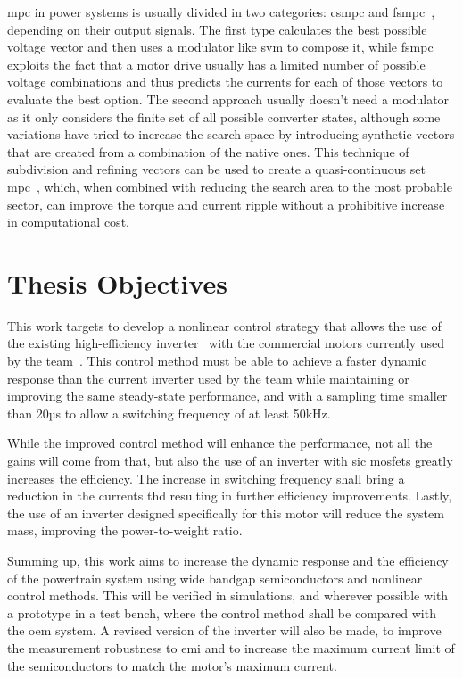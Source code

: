 \gls{mpc} in power systems is usually divided in two categories: \gls{csmpc} and \gls{fsmpc}~\cite{Wang:MPC_in_Electrical_Machines_review:2017:IEEE}, depending on their output signals. The first type calculates the best possible voltage vector and then uses a modulator like \gls{svm} to compose it, while \gls{fsmpc} exploits the fact that a motor drive usually has a limited number of possible voltage combinations and thus predicts the currents for each of those vectors to evaluate the best option. The second approach usually doesn't need a modulator as it only considers the finite set of all possible converter states, although some variations have tried to increase the search space by introducing synthetic vectors that are created from a combination of the native ones. This technique of subdivision and refining vectors can be used to create a quasi-continuous set \gls{mpc}~\cite{Ma:MPC_Syntetic_vector:2014:IEEE}, which, when combined with reducing the search area to the most probable sector, can improve the torque and current ripple without a prohibitive increase in computational cost.
\section{Thesis Objectives}\label{section:objectives}

This work targets to develop a nonlinear control strategy that allows the use of the existing high-efficiency inverter~\cite{Costa:MSc} with the commercial motors currently used by the team~\cite{amk:DD5-14-10-POW}. This control method must be able to achieve a faster dynamic response than the current inverter used by the team while maintaining or improving the same steady-state performance, and with a sampling time smaller than 20µs to allow a switching frequency of at least 50kHz.

While the improved control method will enhance the performance, not all the gains will come from that, but also the use of an inverter with \gls{sic} mosfets greatly increases the efficiency. The increase in switching frequency shall bring a reduction in the currents \gls{thd} resulting in further efficiency improvements. Lastly, the use of an inverter designed specifically for this motor will reduce the system mass, improving the power-to-weight ratio.

Summing up, this work aims to increase the dynamic response and the efficiency of the powertrain system using wide bandgap semiconductors and nonlinear control methods. This will be verified in simulations, and wherever possible with a prototype in a test bench, where the control method shall be compared with the \gls{oem} system. A revised version of the inverter will also be made, to improve the measurement robustness to \gls{emi} and to increase the maximum current limit of the semiconductors to match the motor's maximum current.


